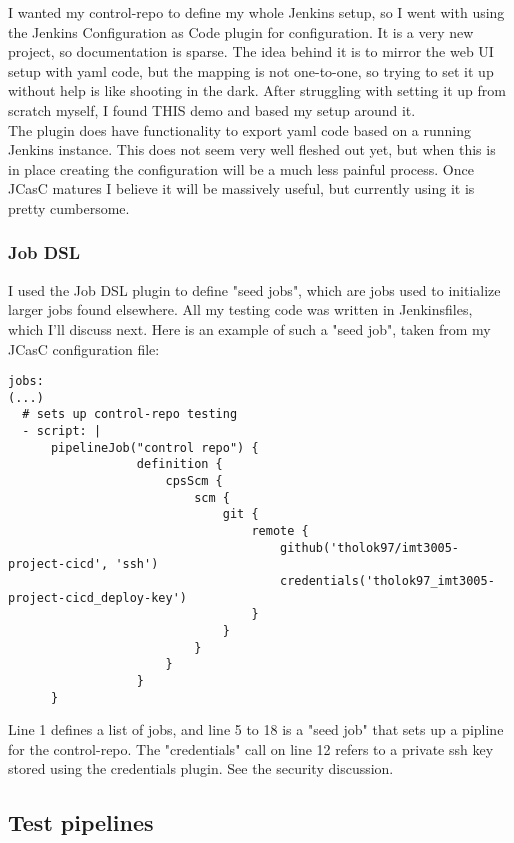 I wanted my control-repo to define my whole Jenkins setup, so I went with using the Jenkins Configuration as Code plugin for configuration. It is a very new project, so documentation is sparse. The idea behind it is to mirror the web UI setup with yaml code, but the mapping is not one-to-one, so trying to set it up without help is like shooting in the dark. After struggling with setting it up from scratch myself, I found THIS demo and based my setup around it. 
\\
The plugin does have functionality to export yaml code based on a running Jenkins instance. This does not seem very well fleshed out yet, but when this is in place creating the configuration will be a much less painful process. Once JCasC matures I believe it will be massively useful, but currently using it is pretty cumbersome.

\subsubsection{Job DSL}

I used the Job DSL plugin to define "seed jobs", which are jobs used to initialize larger jobs found elsewhere. All my testing code was written in Jenkinsfiles, which I'll discuss next. Here is an example of such a "seed job", taken from my JCasC configuration file:

\begin{verbatim}
jobs:
(...)
  # sets up control-repo testing
  - script: |
      pipelineJob("control repo") {
                  definition {
                      cpsScm {
                          scm {
                              git {
                                  remote {
                                      github('tholok97/imt3005-project-cicd', 'ssh')
                                      credentials('tholok97_imt3005-project-cicd_deploy-key')
                                  }
                              }
                          }
                      }
                  }
      }
\end{verbatim}

Line 1 defines a list of jobs, and line 5 to 18 is a "seed job" that sets up a pipline for the control-repo. The "credentials" call on line 12 refers to a private ssh key stored using the credentials plugin. See the security discussion.

\subsection{Test pipelines}

